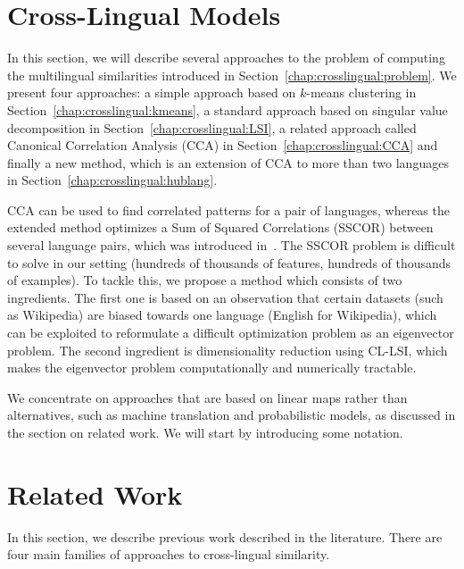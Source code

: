 \section{Cross-Lingual Models}\label{chap:crosslingual:models}
In this section, we will describe several approaches to the problem of computing the 
multilingual similarities introduced in Section~\ref{chap:crosslingual:problem}. We present four approaches:
a simple approach based on $k$-means clustering in Section~\ref{chap:crosslingual:kmeans}, a standard approach
based on singular value decomposition in Section~\ref{chap:crosslingual:LSI}, a related
approach called Canonical Correlation Analysis (CCA) in Section~\ref{chap:crosslingual:CCA} and finally a
new method, which is an extension of CCA to more than two languages in Section~\ref{chap:crosslingual:hublang}.

CCA can be used to find correlated patterns for a pair of languages, whereas the extended method 
optimizes a Sum of Squared Correlations (SSCOR) between several language pairs, which was introduced 
in~\cite{Kettenring}. The SSCOR problem is difficult to solve in our setting (hundreds of thousands 
of features, hundreds of thousands of examples). To tackle this, we propose a method which consists 
of two ingredients. The first one is based on an observation that certain datasets (such as Wikipedia) 
are biased towards one language (English for Wikipedia), which can be exploited to reformulate a 
difficult optimization problem as an eigenvector problem. The second ingredient is dimensionality 
reduction using CL-LSI, which makes the eigenvector problem computationally and numerically tractable.

We concentrate on approaches that are based on linear maps rather than alternatives, such as machine 
translation and probabilistic models, as discussed in the section on related work. We will start 
by introducing some notation.

\section{Related Work}\label{chap:crosslingual:related}
In this section, we describe previous work described  in the literature. There are four main families of approaches to cross-lingual similarity.

